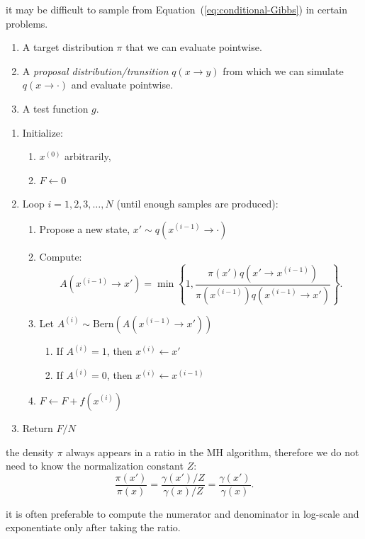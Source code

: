 \documentclass{article}
\begin{document}
 it may be difficult to sample from Equation~(\ref{eq:conditional-Gibbs}) in certain problems.

\begin{enumerate}
  \item A target distribution $\pi$ that we can evaluate pointwise. 
  \item A \emph{proposal distribution/transition} $q(x \to y)$ from which we can simulate $q(x \to \cdot)$ and evaluate pointwise.
  \item A test function $g$.
\end{enumerate}

\begin{enumerate}
  \item Initialize:
  \begin{enumerate}
     \item $x^{(0)}$ arbitrarily,
     \item $F \gets 0$
  \end{enumerate}
  \item Loop $i = 1, 2, 3, \dots, N$ (until enough samples are produced):
  \begin{enumerate}
     \item Propose a new state, $x' \sim q(x^{(i-1)} \to \cdot)$
     \item Compute: \[ A(x^{(i-1)} \to x') = \min\left\{ 1, \frac{\pi(x') q(x' \to x^{(i-1)})}{\pi(x^{(i-1)}) q(x^{(i-1)} \to x')} \right\}. \]
     \item Let $A^{(i)} \sim \text{Bern}(A(x^{(i-1)} \to x'))$
     \begin{enumerate}
       \item If $A^{(i)} = 1$, then $x^{(i)} \gets x'$
       \item If $A^{(i)} = 0$, then $x^{(i)} \gets x^{(i-1)}$
     \end{enumerate}
     \item $F \gets F + f(x^{(i)})$
  \end{enumerate}
  \item Return $F/N$
\end{enumerate}

 the density $\pi$ always appears in a ratio in the MH algorithm, therefore we do not need to know the normalization constant $Z$:
\[ \frac{\pi(x')}{\pi(x)} = \frac{\gamma(x')/Z}{\gamma(x)/Z} = \frac{\gamma(x')}{\gamma(x)}. \]

 it is often preferable to compute the numerator and denominator in log-scale and exponentiate only after taking the ratio.
\end{document}
